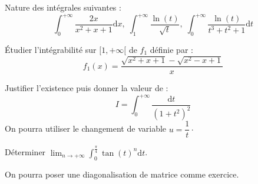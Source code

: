\documentclass[twoside,a4paper,french,10pt]{VcCours}
\newcommand{\dt}{\text{d}t}
\newcommand{\dx}{\text{d}x}
\begin{document}
\begin{enumerate}
\end{enumerate}


    \begin{Exercice} Nature des intégrales suivantes : 
    $$  \int_{0}^{+ \infty} \frac{2x}{x^2+x+1} \dx, \; \int_{1}^{+ \infty} \frac{\ln(t)}{\sqrt{t}}, \; \int_{0}^{+ \infty} \frac{\ln(t)}{t^3+t^2+1} \dt$$
  \end{Exercice} 
    
    \begin{Exercice} Étudier l'intégrabilité sur $[1, + \infty[$ de $f_1$ définie par :
    $$ f_1(x)=\frac{\sqrt{x^2+x+1}-\sqrt{x^2-x+1}}{x}$$
  \end{Exercice} 
    
    \begin{Exercice} Justifier l'existence puis donner la valeur de :
      \[
      I = \int_{0}^{ + \infty} \frac{\dt}{(1 + t^{2})^{2}}
      \]
    On pourra utiliser le changement de variable $u = \dfrac{1}{t} \cdot$
  \end{Exercice} 
    
    \begin{Exercice} Déterminer $ \lim_{n \rightarrow + \infty} \int_{0}^{\frac{\pi}{4}} \tan(t)^n \dt$.
    \end{Exercice} 
    
\begin{Exercice} 
  On pourra poser une diagonalisation de matrice comme exercice.
\end{Exercice} 
    
  
\end{document}
